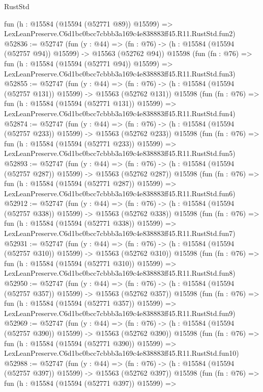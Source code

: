 \begin{lexlean}{RustStd}
\begin{coremodule}
    fun (h : @15584 (@15594 (@52771 @89)) @15599) =>
    LexLeanPreserve.C6d1bc0bcc7cbbb3a169c4e838883ff45.R11.RustStd.fun2)
@52836 := @52747
    (fun (y : @44) =>
    (fn : @76) -> (h : @15584 (@15594 (@52757 @94)) @15599) -> @15563 (@52762 @94))
    @15598
    (fun (fn : @76) =>
    fun (h : @15584 (@15594 (@52771 @94)) @15599) =>
    LexLeanPreserve.C6d1bc0bcc7cbbb3a169c4e838883ff45.R11.RustStd.fun3)
@52855 := @52747
    (fun (y : @44) =>
    (fn : @76) -> (h : @15584 (@15594 (@52757 @131)) @15599) -> @15563 (@52762 @131))
    @15598
    (fun (fn : @76) =>
    fun (h : @15584 (@15594 (@52771 @131)) @15599) =>
    LexLeanPreserve.C6d1bc0bcc7cbbb3a169c4e838883ff45.R11.RustStd.fun4)
@52874 := @52747
    (fun (y : @44) =>
    (fn : @76) -> (h : @15584 (@15594 (@52757 @233)) @15599) -> @15563 (@52762 @233))
    @15598
    (fun (fn : @76) =>
    fun (h : @15584 (@15594 (@52771 @233)) @15599) =>
    LexLeanPreserve.C6d1bc0bcc7cbbb3a169c4e838883ff45.R11.RustStd.fun5)
@52893 := @52747
    (fun (y : @44) =>
    (fn : @76) -> (h : @15584 (@15594 (@52757 @287)) @15599) -> @15563 (@52762 @287))
    @15598
    (fun (fn : @76) =>
    fun (h : @15584 (@15594 (@52771 @287)) @15599) =>
    LexLeanPreserve.C6d1bc0bcc7cbbb3a169c4e838883ff45.R11.RustStd.fun6)
@52912 := @52747
    (fun (y : @44) =>
    (fn : @76) -> (h : @15584 (@15594 (@52757 @338)) @15599) -> @15563 (@52762 @338))
    @15598
    (fun (fn : @76) =>
    fun (h : @15584 (@15594 (@52771 @338)) @15599) =>
    LexLeanPreserve.C6d1bc0bcc7cbbb3a169c4e838883ff45.R11.RustStd.fun7)
@52931 := @52747
    (fun (y : @44) =>
    (fn : @76) -> (h : @15584 (@15594 (@52757 @310)) @15599) -> @15563 (@52762 @310))
    @15598
    (fun (fn : @76) =>
    fun (h : @15584 (@15594 (@52771 @310)) @15599) =>
    LexLeanPreserve.C6d1bc0bcc7cbbb3a169c4e838883ff45.R11.RustStd.fun8)
@52950 := @52747
    (fun (y : @44) =>
    (fn : @76) -> (h : @15584 (@15594 (@52757 @357)) @15599) -> @15563 (@52762 @357))
    @15598
    (fun (fn : @76) =>
    fun (h : @15584 (@15594 (@52771 @357)) @15599) =>
    LexLeanPreserve.C6d1bc0bcc7cbbb3a169c4e838883ff45.R11.RustStd.fun9)
@52969 := @52747
    (fun (y : @44) =>
    (fn : @76) -> (h : @15584 (@15594 (@52757 @390)) @15599) -> @15563 (@52762 @390))
    @15598
    (fun (fn : @76) =>
    fun (h : @15584 (@15594 (@52771 @390)) @15599) =>
    LexLeanPreserve.C6d1bc0bcc7cbbb3a169c4e838883ff45.R11.RustStd.fun10)
@52988 := @52747
    (fun (y : @44) =>
    (fn : @76) -> (h : @15584 (@15594 (@52757 @397)) @15599) -> @15563 (@52762 @397))
    @15598
    (fun (fn : @76) =>
    fun (h : @15584 (@15594 (@52771 @397)) @15599) =>

\end{coremodule}
\end{lexlean}
